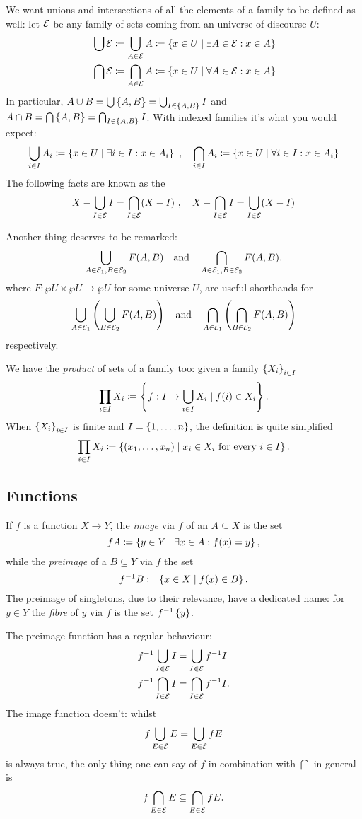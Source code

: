 We want unions and intersections of all the elements of a family to be defined as well: let \(\mathcal E\) be any family of sets coming from an universe of discourse \(U\):
\begin{align*}
& \bigcup \mathcal E \coloneq \bigcup_{A \in \mathcal E} A \coloneq \left\{x \in U \mid \exists A \in \mathcal E : x \in A\right\} \\
& \bigcap \mathcal E \coloneq \bigcap_{A \in \mathcal E} A \coloneq \left\{x \in U \mid \forall A \in \mathcal E : x \in A\right\}
\end{align*}
In particular, \(A \cup B = \bigcup \left\{A, B\right\} = \bigcup_{I \in \left\{A, B\right\}} I\) and \(A \cap B = \bigcap \left\{A, B\right\} = \bigcap_{I \in \left\{A, B\right\}} I\). With indexed families it's what you would expect:
\[\bigcup_{i \in I} A_i \coloneq \left\{x \in U \mid \exists i \in I : x \in A_i\right\} \ ,\quad \bigcap_{i \in I} A_i \coloneq \left\{x \in U \mid \forall i \in I : x \in A_i\right\}\]
The following facts are known as the 
\[X - \bigcup_{I \in \mathcal E} I = \bigcap_{I \in \mathcal E} (X - I) \ , \quad X - \bigcap_{I \in \mathcal E} I = \bigcup_{I \in \mathcal E} (X - I)\]

Another thing deserves to be remarked:
\[\bigcup_{A \in \mathcal E_1, B \in \mathcal E_2} F(A, B) \quad\text{and}\quad \bigcap_{A \in \mathcal E_1, B \in \mathcal E_2} F(A, B),\]
where \(F : \wp U \times \wp U \to \wp U\) for some universe \(U\), are useful shorthands for
\[\bigcup_{A \in \mathcal E_1} \left(\bigcup_{B \in \mathcal E_2} F(A, B)\right) \quad \text{and} \quad \bigcap_{A \in \mathcal E_1} \left(\bigcap_{B \in \mathcal E_2} F(A, B)\right)\]
respectively.

We have the {\em product} of sets of a family too: given a family \(\left\{X_i\right\}_{i \in I}\)
\[\prod_{i \in I} X_i \coloneq \left\{f : I \to \bigcup_{i \in I} X_i \mid f(i) \in X_i\right\}.\]
When \(\left\{X_i\right\}_{i \in I}\) is finite and \(I = \left\{1, \dots{}, n\right\}\), the definition is quite simplified
\[\prod_{i \in I} X_i \coloneq \left\{(x_1, \dots{}, x_n) \mid x_i \in X_i \text{ for every } i \in I\right\}.\]


\subsection{Functions}

If \(f\) is a function \(X \to Y\), the {\em image} via \(f\) of an \(A \subseteq X\) is the set
\[fA \coloneq \left\{y \in Y \mid \exists x \in A : f(x)=y\right\},\]
while the {\em preimage} of a \(B \subseteq Y\) via \(f\) the set
\[f^{-1} B \coloneq \left\{x \in X \mid f(x) \in B\right\}.\]
The preimage of singletons, due to their relevance, have a dedicated name: for \(y \in Y\) the {\em fibre} of \(y\) via \(f\) is the set \(f^{-1}\left\{y\right\}\).

The preimage function has a regular behaviour:
\begin{align*}
& f^{-1} \bigcup_{I \in \mathcal E} I = \bigcup_{I \in \mathcal E} f^{-1} I \\
& f^{-1} \bigcap_{I \in \mathcal E} I = \bigcap_{I \in \mathcal E} f^{-1} I.
\end{align*}
The image function doesn't: whilst
\[f \bigcup_{E \in \mathcal E} E = \bigcup_{E \in \mathcal E} f E\]
is always true, the only thing one can say of \(f\) in combination with \(\bigcap\) in general is
\[f \bigcap_{E \in \mathcal E} E \subseteq \bigcap_{E \in \mathcal E} f E.\]

